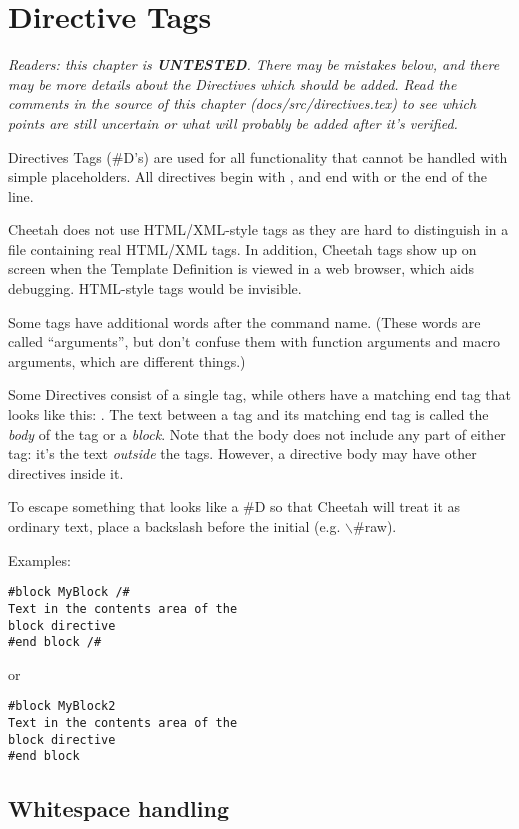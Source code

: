 \section{Directive Tags}

{\em Readers: this chapter is {\bf UNTESTED}.  There may be mistakes below, and
there may be more details about the Directives which should be added.  Read the
comments in the source of this chapter (docs/src/directives.tex) to see which
points are still uncertain or what will probably be added after it's verified.}

Directives Tags (\#D's) are used for all functionality that cannot be handled
with simple placeholders.  All directives begin with \code{\#}, and end with
\code{/\#} or the end of the line.

Cheetah does not use HTML/XML-style tags as they are hard to 
distinguish in a file containing real HTML/XML tags.  In addition, Cheetah tags
show up on screen when the Template Definition is viewed in a web browser,
which aids debugging.  HTML-style tags would be invisible.

Some tags have additional words after the
command name.  (These words are called ``arguments'', but don't confuse them
with function arguments and macro arguments, which are different things.)

Some Directives consist of a single tag, while others have a matching end tag
that looks like this: .  The text between a tag and
its matching end tag is called the {\em body} of the tag or a {\em block}.  Note
that the body does not include any part of either tag: it's the text
{\em outside} the tags.  However, a directive body may have other directives
inside it.

To escape something that looks like a \#D so that Cheetah will treat it as
ordinary text, place a backslash before the initial \code{\#} (e.g.
$\backslash$\#raw).

Examples:

\begin{verbatim}
#block MyBlock /#
Text in the contents area of the
block directive
#end block /#
\end{verbatim}
or
\begin{verbatim}
#block MyBlock2
Text in the contents area of the
block directive
#end block
\end{verbatim}

\subsection{Whitespace handling}

